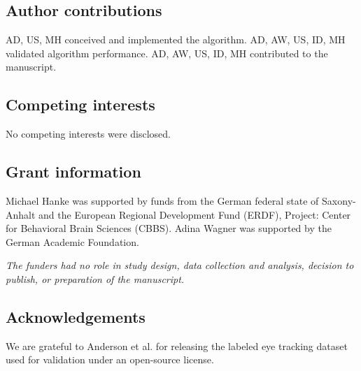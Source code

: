 \documentclass[10pt,a4paper]{extarticle}
\begin{document}
\subsection*{Author contributions}
AD, US, MH conceived and implemented the algorithm.
AD, AW, US, ID, MH validated algorithm performance.
AD, AW, US, ID, MH contributed to the manuscript.

\subsection*{Competing interests}
No competing interests were disclosed.

\subsection*{Grant information}
Michael Hanke was supported by funds from the German federal state of
Saxony-Anhalt and the European Regional Development Fund (ERDF), 
Project: Center for Behavioral Brain Sciences (CBBS).
Adina Wagner was supported by the German Academic Foundation.

\textit{The funders had no role in study design, data collection and analysis,
decision to publish, or preparation of the manuscript.}

\subsection*{Acknowledgements}
We are grateful to Anderson et al. \cite{ALH+2017} for releasing the labeled
eye tracking dataset used for validation under an open-source license.
\end{document}
